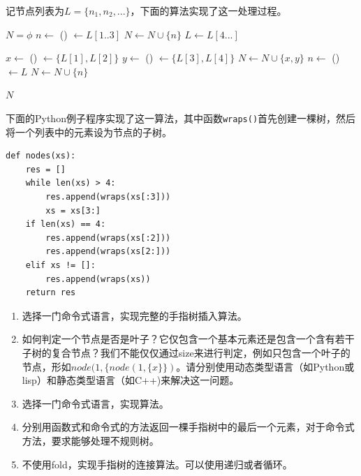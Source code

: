 \documentclass[b5paper]{ctexart}
\begin{document}
记节点列表为$L=\{ n_1, n_2, ... \}$，下面的算法实现了这一处理过程。

\begin{algorithmic}
  \State $N = \phi$
    \State $n \gets$ ()
    \State {} $\gets L[1..3]$  
    \State $N \gets N \cup \{ n \}$
    \State $L \gets L[4...]$ 
  \EndWhile

    \State $x \gets$ ()
    \State {} $\gets \{L[1], L[2]\}$
    \State $y \gets$ ()
    \State {} $\gets \{L[3], L[4]\}$
    \State $N \gets N \cup \{ x, y \}$
    \State $n \gets$ ()
    \State {} $\gets L$
    \State $N \gets N \cup \{ n \}$
  \EndIf

  \State \Return $N$
\EndFunction
\end{algorithmic}

下面的Python例子程序实现了这一算法，其中函数\texttt{wraps()}首先创建一棵树，然后将一个列表中的元素设为节点的子树。

\begin{lstlisting}
def nodes(xs):
    res = []
    while len(xs) > 4:
        res.append(wraps(xs[:3]))
        xs = xs[3:]
    if len(xs) == 4:
        res.append(wraps(xs[:2]))
        res.append(wraps(xs[2:]))
    elif xs != []:
        res.append(wraps(xs))
    return res
\end{lstlisting}

\begin{Exercise}
\begin{enumerate}
\item 选择一门命令式语言，实现完整的手指树插入算法。

\item 如何判定一个节点是否是叶子？它仅包含一个基本元素还是包含一个含有若干子树的复合节点？我们不能仅仅通过size来进行判定，例如只包含一个叶子的节点，形如$node(1, \{node(1, \{x\}\})$。请分别使用动态类型语言（如Python或lisp）和静态类型语言（如C++)来解决这一问题。

\item 选择一门命令式语言，实现算法。

\item 分别用函数式和命令式的方法返回一棵手指树中的最后一个元素，对于命令式方法，要求能够处理不规则树。

\item 不使用fold，实现手指树的连接算法。可以使用递归或者循环。
\end{enumerate}
\end{Exercise}
\end{document}

